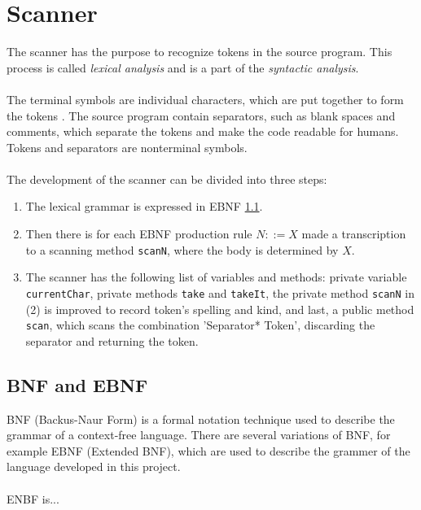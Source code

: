 \section{Scanner}
The scanner has the purpose to recognize tokens in the source program. This process is called \textit{lexical analysis} and is a part of the \textit{syntactic analysis}.
\\
\\
The terminal symbols are individual characters, which are put together to form the tokens \cite{misc:spo}. The source program contain separators, such as blank spaces and comments, which separate the tokens and make the code readable for humans. Tokens and separators are nonterminal symbols.
\\
\\
The development of the scanner can be divided into three steps:
\begin{enumerate}
\item The lexical grammar is expressed in EBNF \ref{sec:ebnf}.
\item Then there is for each EBNF production rule $N::=X$ made a transcription to a scanning method \texttt{scanN}, where the body is determined by $X$.
\item The scanner has the following list of variables and methods: private variable \texttt{currentChar}, private methods \texttt{take} and \texttt{takeIt}, the private method \texttt{scanN} in (2) is improved to record token's spelling and kind, and last, a public method \texttt{scan}, which scans the combination 'Separator* Token', discarding the separator and returning the token.
\end{enumerate}

\subsection{BNF and EBNF}
\label{sec:ebnf}
BNF (Backus-Naur Form) is a formal notation technique used to describe the grammar of a context-free language. There are several variations of BNF, for example EBNF (Extended BNF), which are used to describe the grammer of the language developed in this project.
\\
\\
ENBF is...